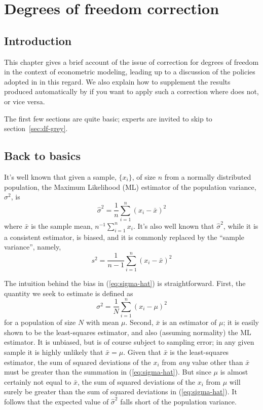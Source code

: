 \chapter{Degrees of freedom correction}
\label{chap:df}


\section{Introduction}

This chapter gives a brief account of the issue of correction for
degrees of freedom in the context of econometric modeling, leading
up to a discussion of the policies adopted in  in this
regard.  We also explain how to supplement the results produced 
automatically by  if you want to apply such a correction
where  does not, or vice versa.

The first few sections are quite basic; experts are invited to skip to
section~\ref{sec:df-grey}.

\section{Back to basics}
\label{sec:df-basics}

It's well known that given a sample, $\{x_i\}$, of size $n$ from a
normally distributed population, the Maximum Likelihood (ML) estimator
of the population variance, $\sigma^2$, is
%
\begin{equation}
\label{eq:sigma-hat}
\hat{\sigma}^2 = \frac{1}{n} \sum_{i=1}^n (x_i - \bar{x})^2
\end{equation}
%
where $\bar{x}$ is the sample mean, $n^{-1} \sum_{i=1}^n x_i$.  It's
also well known that $\hat{\sigma}^2$, while it is a consistent
estimator, is biased, and it is commonly replaced by the ``sample
variance'', namely,
%
\begin{equation}
\label{eq:sample-variance}
s^2 = \frac{1}{n-1} \sum_{i=1}^n (x_i - \bar{x})^2
\end{equation}

The intuition behind the bias in (\ref{eq:sigma-hat}) is
straightforward.  First, the quantity we seek to estimate is defined
as
%
\[
\sigma^2 = \frac{1}{N} \sum_{i=1}^n (x_i - \mu)^2
\]
%
for a population of size $N$ with mean $\mu$.  Second, $\bar{x}$ is an
estimator of $\mu$; it is easily shown to be the least-squares
estimator, and also (assuming normality) the ML estimator.  It is
unbiased, but is of course subject to sampling error; in any given
sample it is highly unlikely that $\bar{x} = \mu$.  Given that
$\bar{x}$ is the least-squares estimator, the sum of squared
deviations of the $x_i$ from \textit{any} value other than $\bar{x}$
must be greater than the summation in (\ref{eq:sigma-hat}).  But since
$\mu$ is almost certainly not equal to $\bar{x}$, the sum of squared
deviations of the $x_i$ from $\mu$ will surely be greater than the sum
of squared deviations in (\ref{eq:sigma-hat}). It follows that the
expected value of $\hat{\sigma}^2$ falls short of the
population variance.

